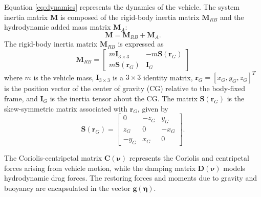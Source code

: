 Equation \eqref{eq:dynamics} represents the dynamics of the vehicle. The system inertia matrix $\mathbf{M}$ is composed of the rigid-body inertia matrix $\mathbf{M}_{RB}$ and the hydrodynamic added mass matrix $\mathbf{M}_A$:
\begin{equation}
    \mathbf{M} = \mathbf{M}_{RB} + \mathbf{M}_A.
\end{equation}
The rigid-body inertia matrix $\mathbf{M}_{RB}$ is expressed as
\begin{equation}
    \mathbf{M}_{RB} =
    \begin{bmatrix}
        m \mathbf{I}_{3\times3} & -m \mathbf{S}(\boldsymbol{r}_G) \\
        m \mathbf{S}(\boldsymbol{r}_G) & \mathbf{I}_G
    \end{bmatrix}
\end{equation}
where $m$ is the vehicle mass, $\mathbf{I}_{3\times3}$ is a $3 \times 3$ identity matrix, $\boldsymbol{r}_G = [x_G, y_G, z_G]^T$ is the position vector of the center of gravity (CG) relative to the body-fixed frame, and $\mathbf{I}_G$ is the inertia tensor about the CG. The matrix $\mathbf{S}(\boldsymbol{r}_G)$ is the skew-symmetric matrix associated with $\boldsymbol{r}_G$, given by
\begin{equation}
    \mathbf{S}(\boldsymbol{r}_G) =
    \begin{bmatrix}
        0 & -z_G & y_G \\
        z_G & 0 & -x_G \\
        -y_G & x_G & 0
    \end{bmatrix}.
\end{equation}


The Coriolis-centripetal matrix $\mathbf{C}(\boldsymbol{\nu})$ represents the Coriolis and centripetal forces arising from vehicle motion, while the damping matrix $\mathbf{D}(\boldsymbol{\nu})$ models hydrodynamic drag forces. The restoring forces and moments due to gravity and buoyancy are encapsulated in the vector $\mathbf{g}(\boldsymbol{\eta})$. 
 
